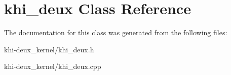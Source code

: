 \hypertarget{classkhi__deux}{
\section{khi\_\-deux Class Reference}
\label{classkhi__deux}
}


The documentation for this class was generated from the following files:\begin{DoxyCompactItemize}
\item 
khi-\/deux\_\-kernel/khi\_\-deux.h\item 
khi-\/deux\_\-kernel/khi\_\-deux.cpp\end{DoxyCompactItemize}
